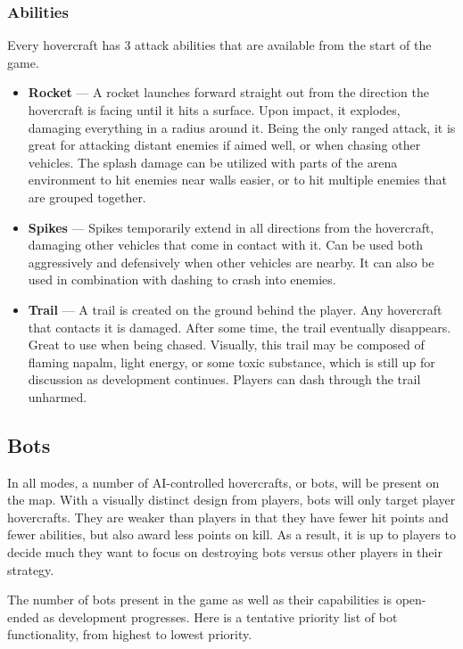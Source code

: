 \documentclass{article}
\theoremstyle{definition}
\begin{document}
\subsubsection{Abilities}

Every hovercraft has 3 attack abilities that are available from the start of
the game.

\begin{itemize}
  \item \textbf{Rocket} --- A rocket launches forward straight out from the
    direction the hovercraft is facing until it hits a surface. Upon impact, it
    explodes, damaging everything in a radius around it. Being the only ranged
    attack, it is great for attacking distant enemies if aimed well, or when
    chasing other vehicles. The splash damage can be utilized with parts of the
    arena environment to hit enemies near walls easier, or to hit multiple
    enemies that are grouped together.
  \item \textbf{Spikes} --- Spikes temporarily extend in all directions from
    the hovercraft, damaging other vehicles that come in contact with it. Can
    be used both aggressively and defensively when other vehicles are nearby.
    It can also be used in combination with dashing to crash into enemies.
  \item \textbf{Trail} --- A trail is created on the ground behind the player.
    Any hovercraft that contacts it is damaged. After some time, the trail
    eventually disappears. Great to use when being chased. Visually, this trail
    may be composed of flaming napalm, light energy, or some toxic substance,
    which is still up for discussion as development continues. Players can dash
    through the trail unharmed.
\end{itemize}

\subsection{Bots}

In all modes, a number of AI-controlled hovercrafts, or bots, will be present
on the map. With a visually distinct design from players, bots will only target
player hovercrafts. They are weaker than players in that they have fewer hit
points and fewer abilities, but also award less points on kill. As a result, it
is up to players to decide much they want to focus on destroying bots versus
other players in their strategy.

The number of bots present in the game as well as their capabilities is
open-ended as development progresses. Here is a tentative priority list of bot
functionality, from highest to lowest priority.
\end{document}

